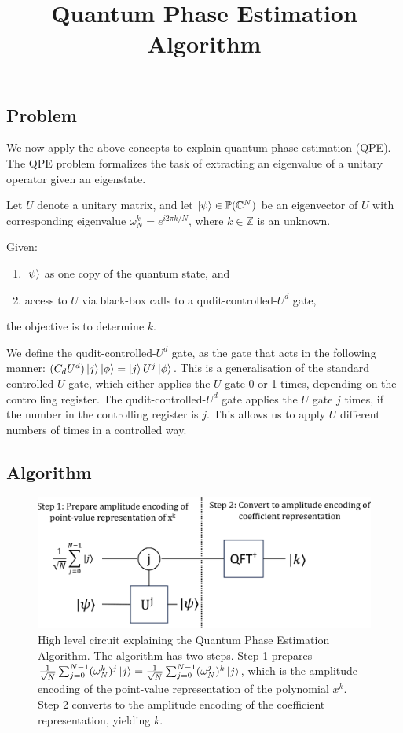 \documentclass[prb,preprint]{revtex4}
\begin{document}
	\subsection{Problem}
	We now apply the above concepts to explain quantum phase estimation (QPE). The QPE problem formalizes the task of extracting an eigenvalue of a unitary operator given an eigenstate. 
	\begin{problem*}
		Let $U$ denote a unitary matrix, and let $\ket{\psi} \in \mathbb{P}(\mathbb{C}^N)$ be an eigenvector of $U$ with corresponding eigenvalue $\omega_N^k = e^{i 2 \pi k/N}$, where $k\in \mathbb{Z}$ is an unknown.  
		
		Given: 
		\begin{enumerate}
			\item $\ket{\psi}$ as one copy of the quantum state, and
			\item access to $U$ via black-box calls to a qudit-controlled-$U^d$ gate,
		\end{enumerate} 
		the objective is to determine $k$. 
	\end{problem*}
	We define the qudit-controlled-$U^d$ gate, as the gate that acts in the following manner:
	$(C_dU^d) \ket{j}\ket{\phi} = \ket{j}U^j\ket{\phi}$. This is a generalisation of the standard controlled-$U$ gate, which either applies the $U$ gate 0 or 1 times, depending on the controlling register. The qudit-controlled-$U^d$ gate applies the $U$ gate $j$ times, if the number in the controlling register is $j$. This allows us to apply $U$ different numbers of times in a controlled way. 
	
	\subsection{Algorithm}
	
	\begin{figure}
		\centering
		\title{Quantum Phase Estimation Algorithm}
		\includegraphics[width=\linewidth]{qpe_circuit.pdf}
		\caption{High level circuit explaining the Quantum Phase Estimation Algorithm. The algorithm has two steps. Step 1 prepares $\frac{1}{\sqrt{N}}\sum_{j=0}^{N-1}  (\omega^{k}_N)^j \ket{j} = \frac{1}{\sqrt{N}}\sum_{j=0}^{N-1}  (\omega^{j}_N)^k \ket{j}$, which is the amplitude encoding of the point-value representation of the polynomial $x^k$. Step 2 converts to the amplitude encoding of the coefficient representation, yielding $k$.}
		\label{fig:qpealgorithm}
	\end{figure}
	
\end{document}
